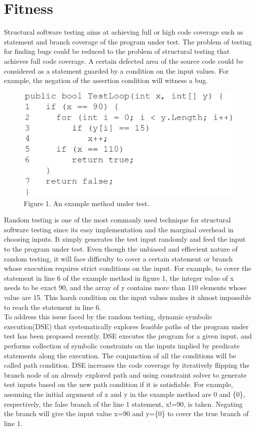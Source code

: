\section{Fitness}
\indent Structural software testing aims at achieving full or high code coverage such as statement and branch coverage of the program under test. The problem of testing for finding bugs could be reduced to the problem of structural testing that achieves full code coverage. A certain defected area of the source code could be considered as a statement guarded by a condition on the input values. For example, the negation of the assertion condition will witness a bug.\\
\begin{figure}[b]
\centering
\includegraphics[scale=0.5]{fig/XiFitnessEPS.eps}
\caption{Figure 1. An example method under test.}
\end{figure}
\indent Random testing is one of the most commanly used technique for structural software testing since its easy implementation and the marginal overhead in choosing inputs. It simply generates the test input randomly and feed the input to the program under test. Even though the unbiased and effiecient nature of random testing, it will face difficulty to cover a certain statement or branch whose execution requires strict conditions on the input. For example, to cover the statement in line 6 of the example method in figure 1, the integer value of x needs to be exact 90, and the array of y contains more than 110 elements whose value are 15. This harsh condition on the input values makes it almost impossible to reach the statement in line 6.\\
\indent To address this issue faced by the random testing, dynamic symbolic execution(DSE) that systematically explores feasible paths of the program under test has been proposed recently. DSE executes the program for a given input, and performs collection of symbolic constraints on the inputs implied by predicate statements along the execution. The conjunction of all the conditions will be called path condition. DSE increases the code coverage by iteratively flipping the branch node of an already explored path and using constraint solver to generate test inputs based on the new path condition if it is satisfiable. For example, assuming the initial argument of x and y in the example method are 0 and \{0\}, respectively, the false branch of the line 1 statement, x!=90, is taken. Negating the branch will give the input value x=90 and y=\{0\} to cover the true branch of line 1. \\
